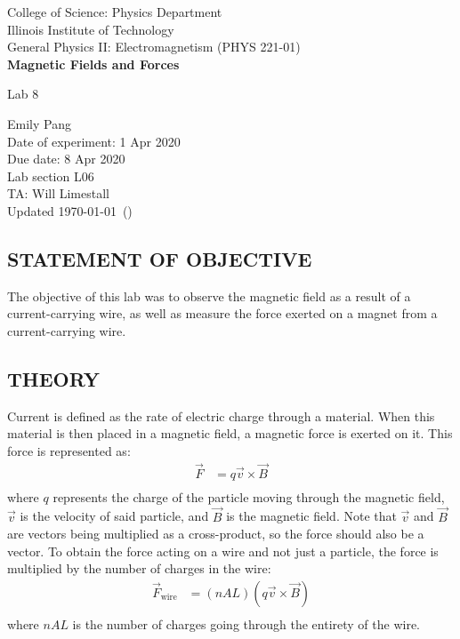 \documentclass [12pt, letterpaper, twoside] {article}
\begin{document}
\begin {titlepage}
\begin {center}
College of Science: Physics Department \\
\vspace {0.1cm}
Illinois Institute of Technology\\
\vspace {0.1cm}
General Physics II: Electromagnetism (PHYS 221-01)\\
\vspace* {\fill}
\begingroup
\Large
\textbf {Magnetic Fields and Forces}
\vspace {0.35cm}

\normalsize
Lab 8
\vspace {1.5cm}
\endgroup
\vspace* {\fill}
\end {center}

\vspace*{\fill}
\begin {flushright}
\footnotesize
Emily Pang \\
Date of experiment: 1 Apr 2020 \\
Due date: 8 Apr 2020 \\
Lab section L06 \\
TA: Will Limestall \\
Updated \usdate\today~(\currenttime)
\end {flushright}
\end {titlepage}
\subsection* {STATEMENT OF OBJECTIVE}
The objective of this lab was to observe the magnetic field as a result of a current-carrying wire, as well as measure the force exerted on a magnet from a current-carrying wire.

\subsection* {THEORY}
Current is defined as the rate of electric charge through a material. When this material is then placed in a magnetic field, a magnetic force is exerted on it. This force is represented as:
\begin{equation*}
  \begin{split}
    \vec{F} &= q\vec{v}\times{\vec{B}} \\
  \end{split}
\end{equation*}
where \(q\) represents the charge of the particle moving through the magnetic field, \(\vec{v}\) is the velocity of said particle, and \(\vec{B}\) is the magnetic field. Note that \(\vec{v}\) and \(\vec{B}\) are vectors being multiplied as a cross-product, so the force should also be a vector. To obtain the force acting on a wire and not just a particle, the force is multiplied by the number of charges in the wire:
\begin{equation*}
  \begin{split}
    \vec{F}_{\text{wire}} &= (nAL)(q\vec{v}\times{\vec{B}}) \\
  \end{split}
\end{equation*}
where \(nAL\) is the number of charges going through the entirety of the wire.
\end{document}
